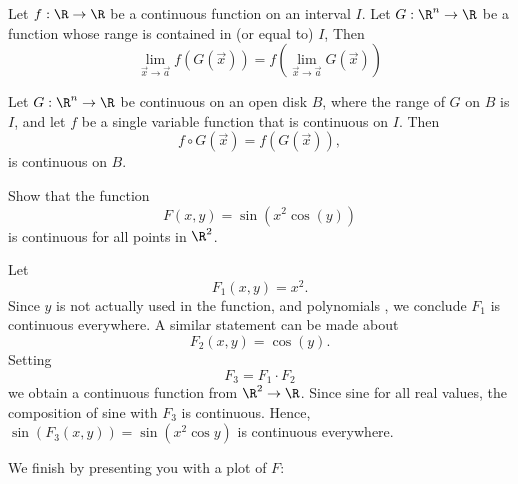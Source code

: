 \documentclass{ximera}
\begin{document}
\begin{theorem}
  Let $f:\R\to\R$ be a continuous function on an interval $I$. Let
  $G:\R^n\to \R$ be a function whose range is contained in (or equal
  to) $I$, Then
  \[
  \lim_{\vec{x}\to\vec{a}} f( G(\vec{x})) = f(\lim_{\vec{x}\to\vec{a}}G(\vec{x}))
  \]
\end{theorem}


\begin{corollary}
  Let $G:\R^n\to \R$ be continuous on an open disk $B$, where the
  range of $G$ on $B$ is $I$, and let $f$ be a single variable
  function that is continuous on $I$. Then
  \[
  f\circ G(\vec{x}) =f(G(\vec{x})),
  \]
  is continuous on $B$.
\end{corollary}



\begin{example}
  Show that the function
  \[
  F(x,y) = \sin(x^2\cos(y))
  \]
  is continuous for all points in $\R^2$.
  \begin{explanation}
    Let
    \[
    F_1(x,y) = x^2.
    \]
    Since $y$ is not actually used in the function, and polynomials
    , we conclude $F_1$ is continuous everywhere. A
    similar statement can be made about
    \[
    F_2(x,y) = \cos(y).
    \]
    Setting
    \[
    F_3=F_1\cdot F_2
    \]
    we obtain a continuous function from $\R^2\to \R$. Since sine  for all real values, the composition of sine with $F_3$
    is continuous. Hence, $\sin (F_3(x,y)) = \sin(x^2\cos y)$ is
    continuous everywhere.
    \begin{onlineOnly}
      We finish by presenting you with a plot of $F$:
      \begin{center}
      \end{center}
    \end{onlineOnly}
  \end{explanation}
\end{example}
\end{document}
